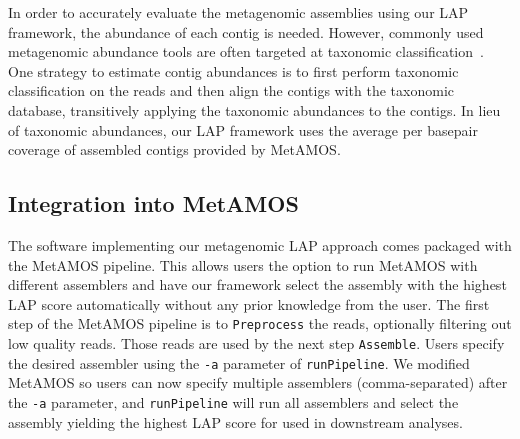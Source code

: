 \documentclass[conference]{IEEEtran}
\begin{document}
In order to accurately evaluate the metagenomic assemblies using our LAP framework, the abundance of each contig is needed.
However, commonly used metagenomic abundance tools are often targeted at taxonomic classification~\cite{segata2012metagenomic,brady2009phymm,liu2010metaphyler,huson2007megan}.
One strategy to estimate contig abundances is to first perform taxonomic classification on the reads and then align the contigs with the taxonomic database, transitively applying the taxonomic abundances to the contigs.
In lieu of taxonomic abundances, our LAP framework uses the average per basepair coverage of assembled contigs provided by MetAMOS.

\subsection{Integration into MetAMOS}

The software implementing our metagenomic LAP approach comes packaged with the MetAMOS pipeline.
This allows users the option to run MetAMOS with different assemblers and have our framework select the assembly with the highest LAP score automatically without any prior knowledge from the user.
The first step of the MetAMOS pipeline is to \verb!Preprocess! the reads, optionally filtering out low quality reads.
Those reads are used by the next step \verb!Assemble!.
Users specify the desired assembler using the \verb!-a! parameter of \verb!runPipeline!.
We modified MetAMOS so users can now specify multiple assemblers (comma-separated) after the \verb!-a! parameter, and \verb!runPipeline! will run all assemblers and select the assembly yielding the highest LAP score for used in downstream analyses.
\end{document}
